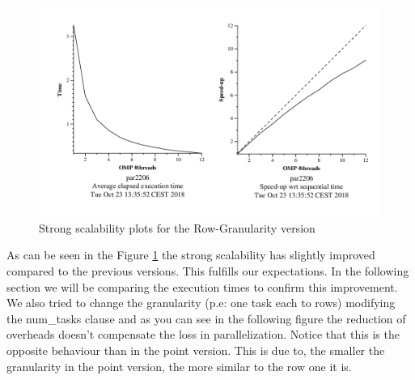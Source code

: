 \documentclass{article}
\begin{document}
\begin{figure}[h]
    \centering
    \includegraphics[width=1\textwidth]{strongRow.png}
    \caption{Strong scalability plots for the Row-Granularity version}
    \label{fig:strongrow}
\end{figure}

\justify
As can be seen in the Figure \ref{fig:strongrow} the strong scalability has slightly improved compared to the previous versions. This fulfills our expectations. In the following section we will be comparing the execution times to confirm this improvement. 
\justify
We also tried to change the granularity (p.e: one task each to rows) modifying the num\_tasks clause and as you can see in the following figure the reduction of overheads doesn't compensate the loss in parallelization. Notice that this is the opposite behaviour than in the point version. This is due to, the smaller the granularity in the point version, the more similar to the row one it is. 
\end{document}
